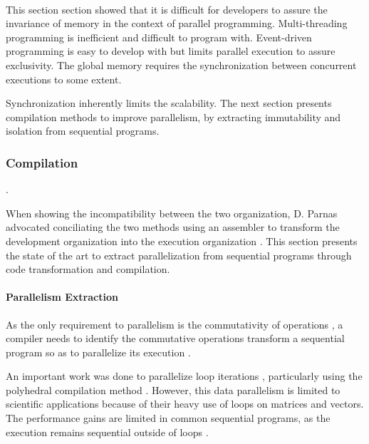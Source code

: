 

\paragraph{}

This section section showed that it is difficult for developers to assure the invariance of memory in the context of parallel programming.
Multi-threading programming is inefficient and difficult to program with.
Event-driven programming is easy to develop with but limits parallel execution to assure exclusivity.
The global memory requires the synchronization between concurrent executions to some extent.

Synchronization inherently limits the scalability.
The next section presents compilation methods to improve parallelism, by extracting immutability and isolation from sequential programs.

\subsubsection{Compilation} \label{chapter3:software-maintainability:performance:compilation}

.

When showing the incompatibility between the two organization, D. Parnas  advocated conciliating the two methods using an assembler to transform the development organization into the execution organization \cite{Parnas1972}.
This section presents the state of the art to extract parallelization from sequential programs through code transformation and compilation.

\paragraph{Parallelism Extraction}

As the only requirement to parallelism is the commutativity of operations \cite{Rinard1996,Clements2013a}, a compiler needs to identify the commutative operations transform a sequential program so as to parallelize its execution \cite{Rinard1996}.

An important work was done to parallelize loop iterations \cite{Mauras1989,Amarasinghe1995,Banerjee2013,Radoi2014}, particularly using the polyhedral compilation method \cite{Yuki2013,Grosser2011,Trifunovic2010,Bastoul2004}.
However, this data parallelism is limited to scientific applications because of their heavy use of loops on matrices and vectors.
The performance gains are limited in common sequential programs, as the execution remains sequential outside of loops \cite{Amdahl1967,Clements2013a}.

